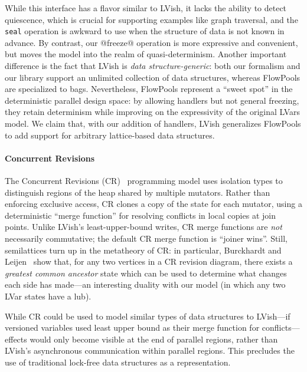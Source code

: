 While
this interface has a flavor similar to LVish, it lacks the ability to
detect quiescence, which is crucial for supporting examples like graph
traversal, and the {\tt seal} operation is awkward to use when the structure of
data is not known in advance.  By contrast, our @freeze@ operation
is more expressive and convenient, but moves the
model into the realm of quasi-determinism.  Another important difference is the
fact that LVish is \emph{data structure-generic}: both our formalism and our library
support an unlimited collection of data structures, whereas FlowPools 
are specialized to bags.
Nevertheless, FlowPools represent a ``sweet spot'' in the deterministic parallel design space: by
allowing handlers but not general freezing, they retain determinism
while improving on the expressivity of the original LVars model.  We
claim that, with our addition of handlers, LVish generalizes FlowPools
to add support for arbitrary lattice-based data structures.

\paragraph{Concurrent Revisions}

The Concurrent Revisions (CR)~\cite{concurrent-revisions-haskell11} programming model
 uses isolation types to distinguish regions of the heap shared
by multiple mutators.  Rather than enforcing exclusive access, CR
clones a copy of the state for each mutator, using a
deterministic ``merge function'' for resolving conflicts in local copies at join points.
Unlike LVish's least-upper-bound writes, CR merge functions are \emph{not} necessarily
commutative; the default CR merge function is ``joiner wins''.
Still, semilattices turn up in the metatheory of CR: in particular,
Burckhardt and Leijen~\cite{semantics-concurrent-revisions} show that,
for any two vertices in a CR revision diagram, there exists a
\emph{greatest common ancestor} state which can be used to determine
what changes each side has made---an interesting duality with our
model (in which any two LVar states have a lub).

While CR could be used to model similar types of data structures to LVish---if
versioned variables used least upper bound as their merge function for
conflicts---effects would only become visible at the end of parallel regions,
rather than LVish's asynchronous communication within parallel regions.  This
precludes the use of traditional lock-free data structures as a representation.


